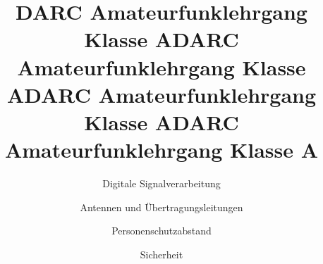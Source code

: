 \documentclass[aspectratio = 169]{beamer}
\begin{document}
\title{DARC Amateurfunklehrgang Klasse A}
\author{Digitale Signalverarbeitung}
\begin{frame}
\maketitle
\end{frame}














\title{DARC Amateurfunklehrgang Klasse A}
\author{Antennen und Übertragungsleitungen}
\begin{frame}
\maketitle
\end{frame}



























\title{DARC Amateurfunklehrgang Klasse A}
\author{Personenschutzabstand}
\begin{frame}
\maketitle
\end{frame}







\title{DARC Amateurfunklehrgang Klasse A}
\author{Sicherheit}
\begin{frame}
\maketitle
\end{frame}



\end{document}
